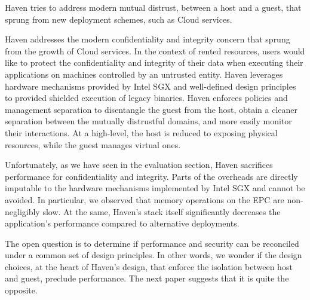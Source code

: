 %

Haven tries to address modern mutual distrust, between a host and a guest, that sprung from new deployment schemes, such as Cloud services.

Haven addresses the modern confidentiality and integrity concern that sprung from the growth of Cloud services.
In the context of rented resources, users would like to protect the confidentiality and integrity of their data when executing their applications on machines controlled by an untrusted entity.
Haven leverages hardware mechanisms provided by Intel SGX and well-defined design principles to provided shielded execution of legacy binaries.
Haven enforces policies and management separation to disentangle the guest from the host, obtain a cleaner separation between the mutually distrustful domains, and more easily monitor their interactions.
At a high-level, the host is reduced to exposing physical resources, while the guest manages virtual ones.

Unfortunately, as we have seen in the evaluation section, Haven sacrifices performance for confidentiality and integrity.
Parts of the overheads are directly imputable to the hardware mechanisms implemented by Intel SGX and cannot be avoided.
In particular, we observed that memory operations on the EPC are non-negligibly slow.
At the same, Haven's stack itself significantly decreases the application's performance compared to alternative deployments.

The open question is to determine if performance and security can be reconciled under a common set of design principles.
In other words, we wonder if the design choices, at the heart of Haven's design, that enforce the isolation between host and guest, preclude performance.
The next paper suggests that it is quite the opposite.